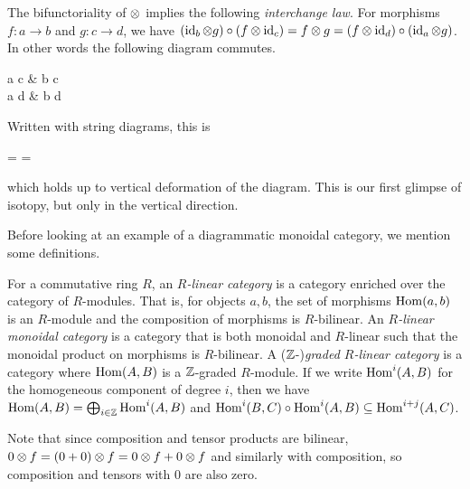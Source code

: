 The bifunctoriality of $\otimes$ implies the following \textit{interchange law}. For morphisms $f: a \to b$ and $g: c \to d$, we have $(\operatorname{id}_b \otimes g) \circ (f \otimes \operatorname{id}_c) = f \otimes g = (f \otimes \operatorname{id}_d) \circ (\operatorname{id}_a \otimes g)$. In other words the following diagram commutes.

\begin{center}
    \begin{mytikzcd}[sep=large]
        a \tensor c \arrow[r,"f \tensor \id_c"] \arrow[d, "\id_a \tensor g"'] \arrow[dr, "f \tensor g"]
        & b \tensor c \arrow[d, "\id_b \tensor g"] \\
        a \tensor d \arrow[r,"f \tensor \id_d"]
        & b \tensor d
    \end{mytikzcd}
\end{center}
Written with string diagrams, this is
\begin{center}
    = 
    = 
\end{center}
which holds up to vertical deformation of the diagram. This is our first glimpse of isotopy, but only in the vertical direction.

 Before looking at an example of a diagrammatic monoidal category, we mention some definitions.

\begin{definition}
    For a commutative ring $R$, an \textit{$R$-linear category} is a category enriched over the category of $R$-modules. That is, for objects $a,b$, the set of morphisms $\operatorname{Hom}(a,b)$ is an $R$-module and the composition of morphisms is $R$-bilinear. An \textit{$R$-linear monoidal category} is a category that is both monoidal and $R$-linear such that the monoidal product on morphisms is $R$-bilinear. A ($\mathbb{Z}$-)\textit{graded $R$-linear category} is a category where $\operatorname{Hom}(A,B)$ is a $\mathbb{Z}$-graded $R$-module. If we write $\operatorname{Hom}^i(A,B)$ for the homogeneous component of degree $i$, then we have $\operatorname{Hom}(A,B) = \bigoplus_{i \in \mathbb{Z}} \operatorname{Hom}^i(A,B)$ and $\operatorname{Hom}^i(B,C) \circ \operatorname{Hom}^i(A,B) \subseteq \operatorname{Hom}^{i+j}(A,C)$.
\end{definition}


Note that since composition and tensor products are bilinear, $0 \otimes f = (0 + 0) \otimes f = 0 \otimes f + 0 \otimes f$ and similarly with composition, so composition and tensors with $0$ are also zero.

